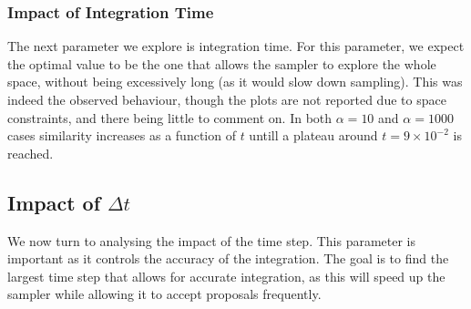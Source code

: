 \documentclass[a4paper, 12pt,oneside]{article}
\begin{document}
			\subsubsection{Impact of Integration Time}
			The next parameter we explore is integration time. For this parameter, we expect the optimal value to be the one that allows the sampler to explore the whole space, without being excessively long (as it would slow down sampling).
			This was indeed the observed behaviour, though the plots are not reported due to space constraints, and there being little to comment on. 
			In both $\alpha=10$ and $\alpha=1000$ cases similarity increases as a function of $t$ untill a plateau around $t=9\times 10^{-2}$ is reached. 
			\subsection{Impact of $\Delta t$}
			We now turn to analysing the impact of the time step. This parameter is important as it controls the accuracy of the integration. The goal is to find the largest time step that allows for accurate integration, as this will speed up the sampler while allowing it to accept proposals frequently.
\end{document}
